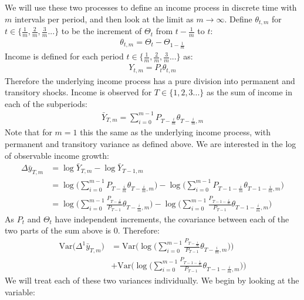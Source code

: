 We will use these two processes to define an income process in discrete time with $m$ intervals per period, and then look at the limit as $m\rightarrow \infty$. Define $\theta_{t,m}$ for $t \in \{\frac{1}{m},\frac{2}{m},\frac{3}{m}...\}$ to be the increment of $\Theta_t$ from $t-\frac{1}{m}$ to $t$:
\begin{align*}
\theta_{t,m} = \Theta_{t}-\Theta_{1-\frac{1}{m}}
\end{align*}
Income is defined for each period $t \in \{\frac{1}{m},\frac{2}{m},\frac{3}{m}...\}$ as:
\begin{align*}
Y_{t,m} = P_t \theta_{t,m}
\end{align*}
Therefore the underlying income process has a pure division into permanent and transitory shocks. Income is observed for $T \in \{1,2,3...\}$ as the sum of income in each of the subperiods:
\begin{align*}
\bar{Y}_{T,m} = \sum_{i=0}^{m-1} P_{T-\frac{i}{m}} \theta_{T-\frac{i}{m},m}
\end{align*}
Note that for $m=1$ this the same as the underlying income process, with permanent and transitory variance as defined above. We are interested in the log of observable income growth:
\begin{align*}
\Delta \bar{y}_{T,m} &= \log{\bar{Y}_{T,m}} - \log{\bar{Y}_{T-1,m}} \\
&= \log\Bigg(\sum_{i=0}^{m-1} P_{T-\frac{i}{m}} \theta_{T-\frac{i}{m},m}\Bigg)
-\log\Bigg(\sum_{i=0}^{m-1} P_{T-1-\frac{i}{m}} \theta_{T-1-\frac{i}{m},m}\Bigg) \\
&= \log\Bigg(\sum_{i=0}^{m-1} \frac{P_{T-\frac{i}{m}}}{P_{T-1}} \theta_{T-\frac{i}{m},m}\Bigg)
-\log\Bigg(\sum_{i=0}^{m-1}\frac{ P_{T-1-\frac{i}{m}}}{P_{T-1}} \theta_{T-1-\frac{i}{m},m}\Bigg) 
\end{align*}
As $P_t$ and $\Theta_t$ have independent increments, the covariance between each of the two parts of the sum above is 0. Therefore:
\begin{align*}
\mathrm{Var}\Big(\Delta^1 \bar{y}_{T,m}\Big) 
&= \mathrm{Var}\Bigg(\log\Bigg(\sum_{i=0}^{m-1} \frac{P_{T-\frac{i}{m}}}{P_{T-1}} \theta_{T-\frac{i}{m},m}\Bigg)\Bigg) \\
&+\mathrm{Var}\Bigg(\log\Bigg(\sum_{i=0}^{m-1}\frac{ P_{T-1-\frac{i}{m}}}{P_{T-1}} \theta_{T-1-\frac{i}{m},m}\Bigg) \Bigg)
\end{align*}
We will treat each of these two variances individually. We begin by looking at the variable:
